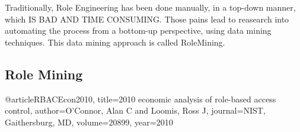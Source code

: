 Traditionally, Role Engineering has been done manually, in a top-down manner, which IS BAD AND TIME CONSUMING. Those pains lead to reasearch into automating the process from a bottom-up perspective, using data mining techniques. This data mining approach is called RoleMining.


\subsection{Role Mining}
@article{RBACEcon2010,
	title={2010 economic analysis of role-based access control},
	author={O’Connor, Alan C and Loomis, Ross J},
	journal={NIST, Gaithersburg, MD},
	volume={20899},
	year={2010}
}
